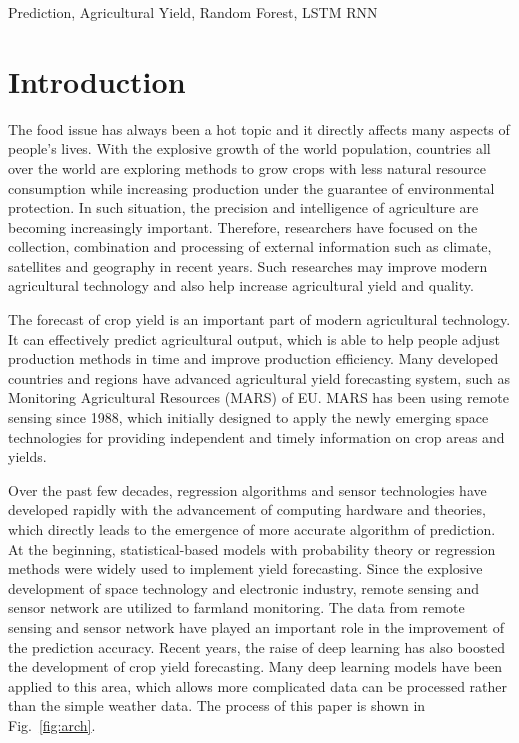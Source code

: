 \documentclass[conference, a4paper]{IEEEtran}
\begin{document}
\begin{IEEEkeywords}
  Prediction, Agricultural Yield, Random Forest, LSTM RNN
\end{IEEEkeywords}

\section{Introduction}
  The food issue has always been a hot topic and it directly affects many aspects of people's lives. With the explosive growth of the world population, countries all over the world are exploring methods to grow crops with less natural resource consumption while increasing production under the guarantee of environmental protection. In such situation, the precision and intelligence of agriculture are becoming increasingly important. Therefore, researchers have focused on the collection, combination and processing of external information such as climate, satellites and geography in recent years. Such researches may improve modern agricultural technology and also help increase agricultural yield and quality.

  The forecast of crop yield is an important part of modern agricultural technology. It can effectively predict agricultural output, which is able to help people adjust production methods in time and improve production efficiency. Many developed countries and regions have advanced agricultural yield forecasting system, such as Monitoring Agricultural Resources (MARS) of EU. MARS has been using remote sensing since 1988, which initially designed to apply the newly emerging space technologies for providing independent and timely information on crop areas and yields. 
  
  Over the past few decades, regression algorithms and sensor technologies have developed rapidly with the advancement of computing hardware and theories, which directly leads to the emergence of more accurate algorithm of prediction. At the beginning, statistical-based models with probability theory or regression methods were widely used to implement yield forecasting\cite{Matis1985, stephens1995crop}. Since the explosive development of space technology and electronic industry, remote sensing and sensor network are utilized to farmland monitoring.  The data from remote sensing and sensor network have played an important role in the improvement of the prediction accuracy\cite{You2017, Baruth}. Recent years, the raise of deep learning has also boosted the development of crop yield forecasting. Many deep learning models have been applied to this area, which allows more complicated data can be processed rather than the simple weather data. The process of this paper is shown in Fig.~\ref{fig:arch}.
\end{document}
